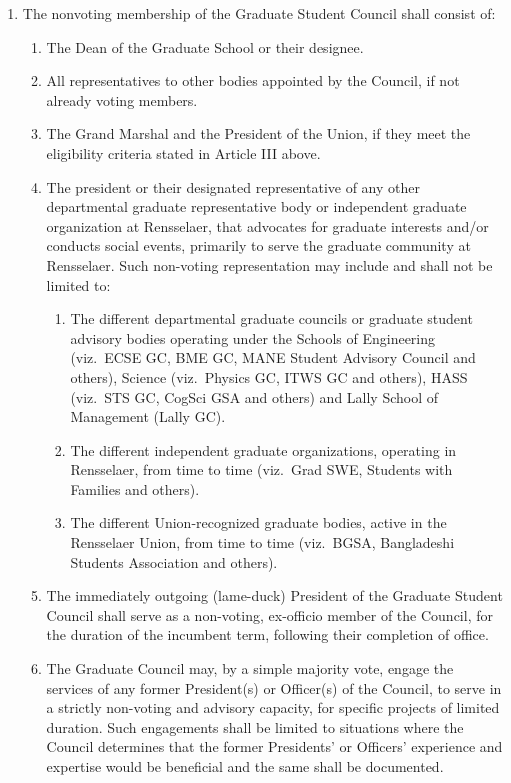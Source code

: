 \begin{enumerate}
\begin{enumerate}
\begin{enumerate}
    \end{enumerate}
  \end{enumerate}
\item The nonvoting membership of the Graduate Student Council shall consist of:
  \begin{enumerate}
  \item The Dean of the Graduate School or their designee.
  \item All representatives to other bodies appointed by the Council, if not already voting members.
  \item The Grand Marshal and the President of the Union, if they meet the eligibility criteria stated in Article III above.
  \item The president or their designated representative of any other departmental graduate representative body or independent graduate organization at Rensselaer, that advocates for graduate interests and/or conducts social events, primarily to serve the graduate community at Rensselaer. Such non-voting representation may include and shall not be limited to:
    \begin{enumerate}
    \item The different departmental graduate councils or graduate student advisory bodies operating under the Schools of Engineering (viz.\ ECSE GC, BME GC, MANE Student Advisory Council and others), Science (viz.\ Physics GC, ITWS GC and others), HASS (viz.\ STS GC, CogSci GSA and others) and Lally School of Management (Lally GC).
    \item The different independent graduate organizations, operating in Rensselaer, from time to time (viz.\ Grad SWE, Students with Families and others).
    \item The different Union-recognized graduate bodies, active in the Rensselaer Union, from time to time (viz.\ BGSA, Bangladeshi Students Association and others).
    \end{enumerate}
  \item The immediately outgoing (lame-duck) President of the Graduate Student Council shall serve as a non-voting, ex-officio member of the Council, for the duration of the incumbent term, following their completion of office.
  \item The Graduate Council may, by a simple majority vote, engage the services of any former President(s) or Officer(s) of the Council, to serve in a strictly non-voting and advisory capacity, for specific projects of limited duration. Such engagements shall be limited to situations where the Council determines that the former Presidents' or Officers' experience and expertise would be beneficial and the same shall be documented.


\end{enumerate}
\end{enumerate}
